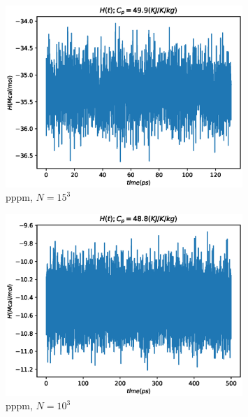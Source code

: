 \documentclass[a4paper,12pt]{article} %
\begin{document}
\begin{figure}[h!]
\begin{center}
\includegraphics[width=0.8\textwidth]{./pics/pppm_H_N15}
\end{center}
\caption{pppm, $N = 15^3$} \label{img:pppm_H_N15}
\end{figure}

\newpage

\begin{figure}[h!]
\begin{center}
\includegraphics[width=0.8\textwidth]{./pics/pppm_H_N10}
\end{center}
\caption{pppm, $N = 10^3$} \label{img:pppm_H_N10}
\end{figure}
\end{document}
